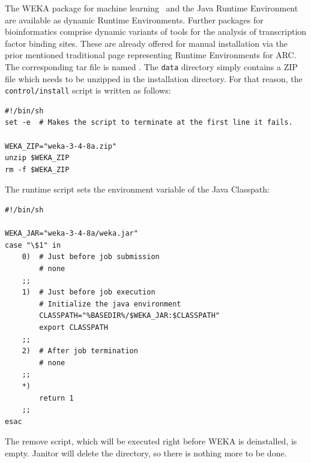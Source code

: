 The WEKA package for machine learning~\cite{FRANK_20074} and the Java Runtime Environment
are available as dynamic Runtime Environments. Further packages for bioinformatics comprise dynamic
variants of tools for the analysis of transcription factor binding sites. These are already offered for manual
installation via the prior mentioned traditional page representing Runtime Environments for ARC. 
The corresponding tar file is named . The \texttt{data} directory simply contains a ZIP file
which needs to be unzipped in the installation directory. For that reason, the \texttt{control/install} script is 
written as follows:
\begin{verbatim} 
#!/bin/sh
set -e  # Makes the script to terminate at the first line it fails.

WEKA_ZIP="weka-3-4-8a.zip"
unzip $WEKA_ZIP
rm -f $WEKA_ZIP
\end{verbatim}
The runtime script sets the environment variable of the Java Classpath:
\begin{verbatim}
#!/bin/sh

WEKA_JAR="weka-3-4-8a/weka.jar"
case "\$1" in
	0)	# Just before job submission
		# none
	;;
	1)	# Just before job execution
		# Initialize the java environment
		CLASSPATH="%BASEDIR%/$WEKA_JAR:$CLASSPATH"
		export CLASSPATH
	;;
	2)	# After job termination
		# none
	;;
	*)
		return 1
	;;
esac	
\end{verbatim}
The remove script, which will be executed right before WEKA is deinstalled, is empty. Janitor will delete the directory, so there
is nothing more to be done.\\





